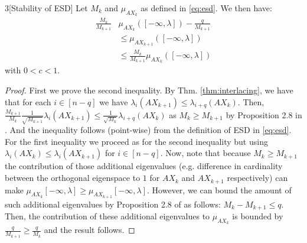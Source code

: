 \documentclass[12pt,conference,compsocconf]{IEEEtran}
\begin{document}
\begin{customcorollary}{3}[Stability of ESD]\label{thm:stabilityesd}
Let $M_k$ and $\mu_{AX_k}$ as defined in \eqref{eq:esd}. We then have:
\begin{align}\label{eq:stabilityofESD}
	\frac{M_k}{M_{k+1}}&\mu_{AX_k}([-\infty,\lambda])-\frac{q}{M_{k+1}}\\ \nonumber
    &\leq \mu_{AX_{k+1}}([-		 \infty,\lambda])\\ \nonumber
    &\leq \frac{M_{k}}{M_{k+1}}\mu_{AX_k}([-\infty,\lambda]) \nonumber
\end{align}
with $0<c<1$.
\begin{proof}
First we prove the second inequality. By Thm. \ref{thm:interlacing}, we have that for each $i \in [n-q]$ we have $\lambda_i(AX_{k+1}) \leq \lambda_{i+q}(AX_k)$. Then, $\frac{M_{k+1}}{M_k} \frac{1}{\sqrt{M_{k+1}}} \lambda_i(AX_{k+1}) \leq \frac{1}{\sqrt{M_{k}}} \lambda_{i+q}(AX_k)$ as $M_k\geq M_{k+1}$ by Proposition 2.8 in \cite{Gratton}. And the inequality follows (point-wise) from the definition of ESD in \eqref{eq:esd}.\\
For the first inequality we proceed as for the second inequality but using $\lambda_i(AX_k) \leq \lambda_i(AX_{k+1}) $ for $i \in [n-q]$. Now, note that because $M_k\geq M_{k+1}$ the contribution of those additional eigenvalues (e.g. difference in cardinality between the orthogonal eigenspace to $1$ for $AX_k$ and $AX_{k+1}$ respectively) can make $\mu_{AX_k}[-\infty,\lambda]\geq \mu_{AX_{k+1}}[-\infty,\lambda]$. However, we can bound the amount of such additional eigenvalues by Proposition 2.8 of \cite{Gratton} as follows: $M_k - M_{k+1} \leq q$. Then, the contribution of these additional eigenvalues to $\mu_{AX_k}$ is bounded by $\frac{q}{M_{k+1}}\geq \frac{q}{M_k}$ and the result follows.
\end{proof}
\end{customcorollary}
\end{document}
